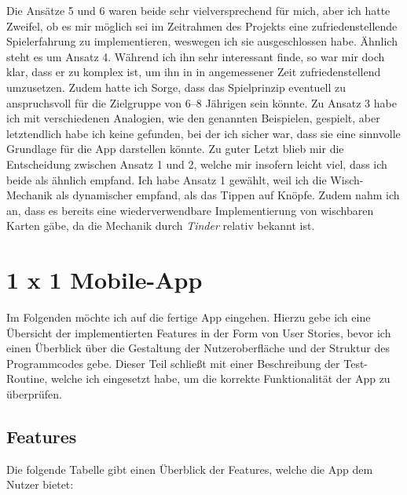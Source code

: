 Die Ansätze 5 und 6 waren beide sehr vielversprechend für mich, aber ich hatte Zweifel, ob es mir möglich sei im Zeitrahmen des Projekts eine zufriedenstellende Spielerfahrung zu implementieren, weswegen ich sie ausgeschlossen habe.
Ähnlich steht es um Ansatz 4. Während ich ihn sehr interessant finde, so war mir doch klar, dass er zu komplex ist, um ihn in in angemessener Zeit zufriedenstellend umzusetzen.
Zudem hatte ich Sorge, dass das Spielprinzip eventuell zu anspruchsvoll für die Zielgruppe von 6--8 Jährigen sein könnte.
Zu Ansatz 3 habe ich mit verschiedenen Analogien, wie den genannten Beispielen, gespielt, aber letztendlich habe ich keine gefunden, bei der ich sicher war, dass sie eine sinnvolle Grundlage für die App darstellen könnte.
Zu guter Letzt blieb mir die Entscheidung zwischen Ansatz 1 und 2, welche mir insofern leicht viel, dass ich beide als ähnlich empfand.
Ich habe Ansatz 1 gewählt, weil ich die Wisch-Mechanik als dynamischer empfand, als das Tippen auf Knöpfe. 
Zudem nahm ich an, dass es bereits eine wiederverwendbare Implementierung von wischbaren Karten gäbe, da die Mechanik durch \emph{Tinder} relativ bekannt ist. 

\section{1 x 1 Mobile-App}

Im Folgenden möchte ich auf die fertige App eingehen. Hierzu gebe ich eine Übersicht der implementierten Features in der Form von User Stories, bevor ich einen Überblick über die Gestaltung der Nutzeroberfläche und der Struktur des Programmcodes gebe.
Dieser Teil schließt mit einer Beschreibung der Test-Routine, welche ich eingesetzt habe, um die korrekte Funktionalität der App zu überprüfen.

\subsection{Features}

Die folgende Tabelle gibt einen Überblick der Features, welche die App dem Nutzer bietet:

